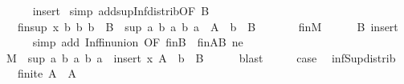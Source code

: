 \begin{isabellebody}
\ \ \ \ \isamarkupfalse%
\ insert\ \isamarkupfalse%
{\isacharparenleft}{\kern0pt}simp\ add{\isacharcolon}{\kern0pt}sup{\isacharunderscore}{\kern0pt}Inf{}{\isacharunderscore}{\kern0pt}distrib{\isacharbrackleft}{\kern0pt}OF\ B{\isacharbrackright}{\kern0pt}{\isacharparenright}{\kern0pt}\isanewline
\ \ \isamarkupfalse%
\ \isamarkupfalse%
\ {\isachardoublequoteopen}{\isasymdots}\ {\isacharequal}{\kern0pt}\ {\isasymSqinter}\isactrlsub f\isactrlsub i\isactrlsub n{\isacharparenleft}{\kern0pt}{\isacharbraceleft}{\kern0pt}sup\ x\ b\ {\isacharbar}{\kern0pt}b{\isachardot}{\kern0pt}\ b\ {\isasymin}\ B{\isacharbraceright}{\kern0pt}\ {\isasymunion}\ {\isacharbraceleft}{\kern0pt}sup\ a\ b\ {\isacharbar}{\kern0pt}a\ b{\isachardot}{\kern0pt}\ a\ {\isasymin}\ A\ {\isasymand}\ b\ {\isasymin}\ B{\isacharbraceright}{\kern0pt}{\isacharparenright}{\kern0pt}{\isachardoublequoteclose}\isanewline
\ \ \ \ {\isacharparenleft}{\kern0pt}\ {\isachardoublequoteopen}{\isacharunderscore}{\kern0pt}\ {\isacharequal}{\kern0pt}\ {\isasymSqinter}\isactrlsub f\isactrlsub i\isactrlsub n{\isacharquery}{\kern0pt}M{\isachardoublequoteclose}{\isacharparenright}{\kern0pt}\isanewline
\ \ \ \ \isamarkupfalse%
\ B\ insert\isanewline
\ \ \ \ \isamarkupfalse%
\ {\isacharparenleft}{\kern0pt}simp\ add{\isacharcolon}{\kern0pt}\ Inf{\isacharunderscore}{\kern0pt}fin{\isachardot}{\kern0pt}union\ {\isacharbrackleft}{\kern0pt}OF\ finB\ {\isacharunderscore}{\kern0pt}\ finAB\ ne{\isacharbrackright}{\kern0pt}{\isacharparenright}{\kern0pt}\isanewline
\ \ \isamarkupfalse%
\ \isamarkupfalse%
\ {\isachardoublequoteopen}{\isacharquery}{\kern0pt}M\ {\isacharequal}{\kern0pt}\ {\isacharbraceleft}{\kern0pt}sup\ a\ b\ {\isacharbar}{\kern0pt}a\ b{\isachardot}{\kern0pt}\ a\ {\isasymin}\ insert\ x\ A\ {\isasymand}\ b\ {\isasymin}\ B{\isacharbraceright}{\kern0pt}{\isachardoublequoteclose}\isanewline
\ \ \ \ \isamarkupfalse%
\ blast\isanewline
\ \ \isamarkupfalse%
\ \isamarkupfalse%
\ {\isacharquery}{\kern0pt}case\ \isacommand{{\isachardot}{\kern0pt}}\isamarkupfalse%
\isanewline
{}\isamarkupfalse%
%
\endisatagproof
{\isafoldproof}%
%
\isadelimproof
\isanewline
%
\endisadelimproof
\isanewline
{}\isamarkupfalse%
\ inf{\isacharunderscore}{\kern0pt}Sup{}{\isacharunderscore}{\kern0pt}distrib{\isacharcolon}{\kern0pt}\isanewline
\ \ \ {\isachardoublequoteopen}finite\ A{\isachardoublequoteclose}\ \ {\isachardoublequoteopen}A\ {\isasymnoteq}\ {\isacharbraceleft}{\kern0pt}{\isacharbraceright}{\kern0pt}{\isachardoublequoteclose}\isanewline

\end{isabellebody}
